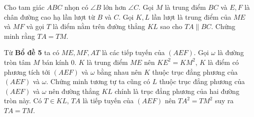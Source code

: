 \begin{prob}
	Cho tam giác $ABC$ nhọn có $\angle B$ lớn hơn $\angle C$. Gọi $M$ là trung điểm $BC$ và $E, F$ là chân đường cao hạ lần lượt từ $B$ và $C$. Gọi $K, L$ lần lượt là trung điểm của $ME$ và $MF$ và gọi $T$ là điểm nằm trên đường thẳng $KL$ sao cho $TA \parallel BC$. Chứng minh rằng $TA = TM$.
\end{prob}

\begin{center}

\end{center}

Từ \textbf{Bổ đề 5} ta có $ME, MF, AT$ là các tiếp tuyến của $(AEF)$. Gọi $\omega$ là đường tròn tâm $M$ bán kính $0$. $K$ là trung điểm $ME$ nên $KE^2 = KM^2$, $K$ là điểm có phương tích tới $(AEF)$ và $\omega$ bằng nhau nên $K$ thuộc trục đẳng phương của $(AEF)$ và $\omega$. Chứng minh tương tự ta cũng có $L$ thuộc trục đẳng phương của $(AEF)$ và $\omega$ nên đường thẳng $KL$ chính là trục đẳng phương của hai đường tròn này. Có $T \in KL$, $TA$ là tiếp tuyến của $(AEF)$ nên $TA^2 = TM^2$ suy ra $TA = TM$.
